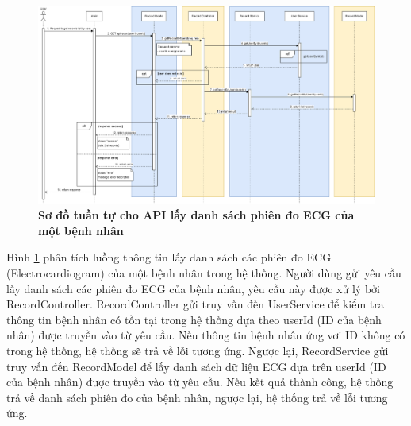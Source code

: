 \begin{figure}[H]
  \centering
  \includegraphics[scale=0.3]{Images/sequence_api/getRecordsByUser.png}
  \caption[Sơ đồ tuần tự cho API lấy danh sách phiên đo ECG của một bệnh nhân ]{\bfseries \fontsize{12pt}{0pt}
  \selectfont Sơ đồ tuần tự cho API lấy danh sách phiên đo ECG của một bệnh nhân }
  \label{api_getRecordsByUser} %
\end{figure}
Hình \ref{api_getRecordsByUser} phân tích luồng thông tin lấy danh sách các phiên đo ECG (Electrocardiogram) của một bệnh nhân trong hệ thống. Người dùng gửi yêu cầu lấy danh sách các phiên đo ECG của bệnh nhân, 
yêu cầu này được xử lý bởi RecordController. RecordController gửi truy vấn đến UserService để kiểm tra thông tin bệnh nhân có tồn tại trong hệ thống dựa theo userId (ID của bệnh nhân) được truyền vào từ yêu cầu. Nếu thông tin bệnh nhân ứng vơi ID không có trong hệ thống, hệ thống sẽ
trả về lỗi tương ứng. Ngược lại, RecordService gửi truy vấn đến RecordModel để lấy danh sách dữ liệu ECG dựa trên userId (ID của bệnh nhân) được truyền vào từ yêu cầu. 
Nếu kết quả thành công, hệ thống trả về danh sách phiên đo của bệnh nhân, ngược lại, hệ thống trả về lỗi tương ứng.

